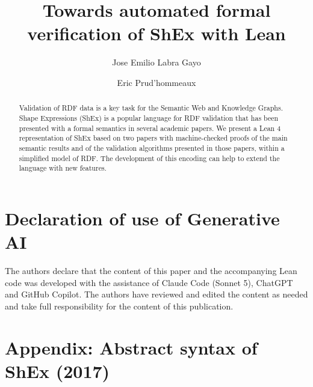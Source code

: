 \documentclass[runningheads]{llncs}
\begin{document}
%
\title{Towards automated formal verification of ShEx with Lean}
%
%
\author{Jose Emilio Labra Gayo 
   \and Eric Prud'hommeaux} 
%
%
%
\maketitle              %
%
\begin{abstract}
Validation of RDF data is a key task for the Semantic Web and Knowledge Graphs.
Shape Expressions (ShEx) is a popular language for RDF validation 
 that has been presented with a formal semantics in several academic papers.
We present a Lean 4 representation of ShEx based on two papers
with machine-checked proofs of the main semantic results and of the validation algorithms
 presented in those papers, within a simplified model of RDF.
The development of this encoding can help to extend the language with new features.

\end{abstract}
%
%
%










\section*{Declaration of use of Generative AI}

The authors declare that the content of this paper and the accompanying Lean code 
 was developed with the assistance of Claude Code (Sonnet 5), ChatGPT and GitHub Copilot. 
The authors have reviewed and edited the content as needed and take 
 full responsibility for the content of this publication.
 



\section{Appendix: Abstract syntax of ShEx (2017)} \label{sec:appendixAbstractSyntaxShEx2017}
\end{document}
